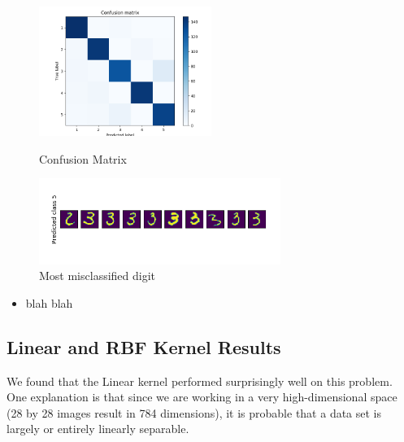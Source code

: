 \documentclass[a4paper]{article}
\begin{document}
\begin{figure}[h]
  \begin{center}
    \includegraphics[width=0.5\textwidth]{3_b_cm.png}
    \caption{Confusion Matrix}
    \includegraphics[width=0.7\textwidth]{3_b_err.png}
    \caption{Most misclassified digit}
  \end{center}
\end{figure}
\begin{itemize}
  \item blah blah
\end{itemize}

\subsection{Linear and RBF Kernel Results}

We found that the Linear kernel performed surprisingly well on this problem.  One explanation is that since we are working in a very high-dimensional space (28 by 28 images result in 784 dimensions), it is probable that a data set is largely or entirely linearly separable.
\end{document}
